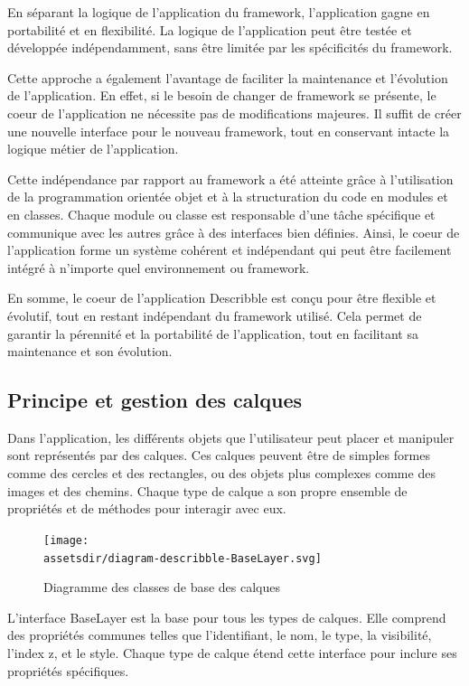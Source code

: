 En séparant la logique de l'application du framework, l'application gagne en portabilité et en flexibilité. La logique de l'application peut être testée et développée indépendamment, sans être limitée par les spécificités du framework.

Cette approche a également l'avantage de faciliter la maintenance et l'évolution de l'application. En effet, si le besoin de changer de framework se présente, le coeur de l'application ne nécessite pas de modifications majeures. Il suffit de créer une nouvelle interface pour le nouveau framework, tout en conservant intacte la logique métier de l'application.

Cette indépendance par rapport au framework a été atteinte grâce à l'utilisation de la programmation orientée objet et à la structuration du code en modules et en classes. Chaque module ou classe est responsable d'une tâche spécifique et communique avec les autres grâce à des interfaces bien définies. Ainsi, le coeur de l'application forme un système cohérent et indépendant qui peut être facilement intégré à n'importe quel environnement ou framework.

En somme, le coeur de l'application \Gls{Describble} est conçu pour être flexible et évolutif, tout en restant indépendant du framework utilisé. Cela permet de garantir la pérennité et la portabilité de l'application, tout en facilitant sa maintenance et son évolution.

\subsection{Principe et gestion des calques}

Dans l'application, les différents objets que l'utilisateur peut placer et manipuler sont représentés par des calques. Ces calques peuvent être de simples formes comme des cercles et des rectangles, ou des objets plus complexes comme des images et des chemins. Chaque type de calque a son propre ensemble de propriétés et de méthodes pour interagir avec eux.

\begin{figure}[h]
    \centering
    \texttt{[image: \\assetsdir/diagram-describble-BaseLayer.svg]}
    \caption{Diagramme des classes de base des calques}
    \label{fig:baseLayerDiagram}
\end{figure}

L'interface BaseLayer est la base pour tous les types de calques. Elle comprend des propriétés communes telles que l'identifiant, le nom, le type, la visibilité, l'index z, et le style. Chaque type de calque étend cette interface pour inclure ses propriétés spécifiques.

